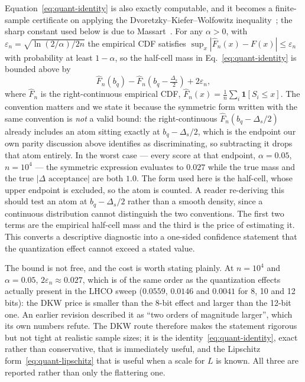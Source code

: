 \documentclass[preprint,12pt]{elsarticle}
\begin{document}
Equation~\eqref{eq:quant-identity} is also exactly computable, and it becomes a
finite-sample certificate on applying the Dvoretzky--Kiefer--Wolfowitz
inequality~\cite{Dvoretzky1956}; the sharp constant used below is due to
Massart~\cite{Massart1990}.  For any $\alpha>0$, with
$\varepsilon_n=\sqrt{\ln(2/\alpha)/2n}$ the empirical CDF satisfies
$\sup_x|\hat F_n(x)-F(x)|\le\varepsilon_n$ with probability at least
$1-\alpha$, so the half-cell mass in Eq.~\eqref{eq:quant-identity} is bounded
above by
\begin{equation}
 \hat F_n(b_q)-\hat F_n\!\left(b_q-\tfrac{\Delta_s}{2}\right)+2\varepsilon_n ,
 \label{eq:quant-dkw}
\end{equation}
where $\hat F_n$ is the right-continuous empirical CDF,
$\hat F_n(x)=\frac1n\sum_i \mathbf{1}[S_i\le x]$.  The convention matters and we
state it because the symmetric form written with the same convention is
\emph{not} a valid bound: the right-continuous $\hat F_n(b_q-\Delta_s/2)$
already includes an atom sitting exactly at $b_q-\Delta_s/2$, which is the
endpoint our own parity discussion above identifies as discriminating, so
subtracting it drops that atom entirely.  In the worst case --- every score at
that endpoint, $\alpha=0.05$, $n=10^4$ --- the symmetric expression evaluates to
$0.027$ while the true mass and the true $|\Delta\text{ acceptance}|$ are both
$1.0$.  The form used here is the half-cell, whose upper endpoint is excluded, so
the atom is counted.  A reader re-deriving this should test an atom at
$b_q-\Delta_s/2$ rather than a smooth density, since a continuous distribution
cannot distinguish the two conventions.
The first two terms are the empirical half-cell mass and the third is the price
of estimating it.  This converts a descriptive diagnostic into a one-sided
confidence statement that the quantization effect cannot exceed a stated value.

The bound is not free, and the cost is worth stating plainly.  At $n=10^4$ and
$\alpha=0.05$, $2\varepsilon_n\approx 0.027$, which is of the same order as the
quantization effects actually present in the LHCO sweep ($0.0559$, $0.0146$ and
$0.0041$ for 8, 10 and 12 bits): the DKW price is smaller than the 8-bit effect
and larger than the 12-bit one.  An earlier revision described it as ``two orders
of magnitude larger'', which its own numbers refute.  The DKW route therefore
makes the statement rigorous but not tight at realistic sample sizes; it is the
identity~\eqref{eq:quant-identity}, exact rather than conservative, that is
immediately useful, and the Lipschitz form~\eqref{eq:quant-lipschitz} that is
useful when a scale for $L$ is known.  All three are reported rather than only
the flattering one.
\end{document}
